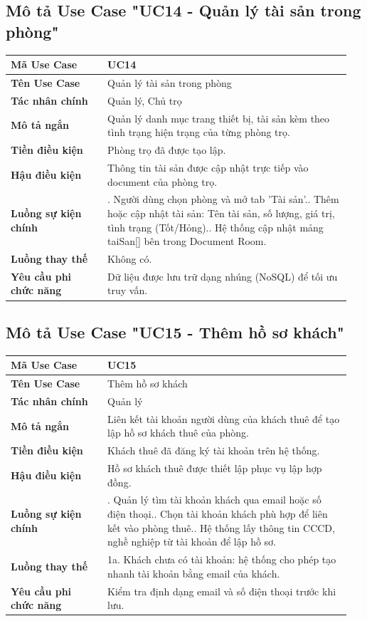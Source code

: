 \subsection{Mô tả Use Case "UC14 - Quản lý tài sản trong phòng"}

\begin{longtable}[]{@{}>{\RaggedRight\arraybackslash}p{0.27\linewidth}>{\RaggedRight\arraybackslash}p{0.68\linewidth}@{}}
\toprule
\textbf{Mã Use Case} & UC14\tabularnewline
\midrule
\endhead
\textbf{Tên Use Case} & Quản lý tài sản trong phòng\tabularnewline
\textbf{Tác nhân chính} & Quản lý, Chủ trọ\tabularnewline
\textbf{Mô tả ngắn} & Quản lý danh mục trang thiết bị, tài sản kèm theo
tình trạng hiện trạng của từng phòng trọ.\tabularnewline
\textbf{Tiền điều kiện} & Phòng trọ đã được tạo lập.\tabularnewline
\textbf{Hậu điều kiện} & Thông tin tài sản được cập nhật trực tiếp vào
document của phòng trọ.\tabularnewline
\textbf{Luồng sự kiện chính} & 1. Người dùng chọn
phòng và mở tab 'Tài sản'.\newline 2. Thêm hoặc cập nhật tài sản:
Tên tài sản, số lượng, giá trị, tình trạng (Tốt/Hỏng).\newline 3.
Hệ thống cập nhật mảng taiSan{[}{]} bên trong Document
Room.\tabularnewline
\textbf{Luồng thay thế} & Không có.\tabularnewline
\textbf{Yêu cầu phi chức năng} & Dữ liệu được lưu trữ dạng nhúng (NoSQL)
để tối ưu truy vấn.\tabularnewline
\bottomrule
\end{longtable}

\subsection{Mô tả Use Case "UC15 - Thêm hồ sơ khách"}

\begin{longtable}[]{@{}>{\RaggedRight\arraybackslash}p{0.27\linewidth}>{\RaggedRight\arraybackslash}p{0.68\linewidth}@{}}
\toprule
\textbf{Mã Use Case} & UC15\tabularnewline
\midrule
\endhead
\textbf{Tên Use Case} & Thêm hồ sơ khách\tabularnewline
\textbf{Tác nhân chính} & Quản lý\tabularnewline
\textbf{Mô tả ngắn} & Liên kết tài khoản người dùng của khách thuê để
tạo lập hồ sơ khách thuê của phòng.\tabularnewline
\textbf{Tiền điều kiện} & Khách thuê đã đăng ký tài khoản trên hệ
thống.\tabularnewline
\textbf{Hậu điều kiện} & Hồ sơ khách thuê được thiết lập phục vụ lập hợp
đồng.\tabularnewline
\textbf{Luồng sự kiện chính} & 1. Quản lý tìm tài
khoản khách qua email hoặc số điện thoại.\newline 2. Chọn tài khoản
khách phù hợp để liên kết vào phòng thuê.\newline 3. Hệ thống lấy
thông tin CCCD, nghề nghiệp từ tài khoản để lập hồ sơ.\tabularnewline
\textbf{Luồng thay thế} & 1a. Khách chưa có tài khoản: hệ thống cho phép
tạo nhanh tài khoản bằng email của khách.\tabularnewline
\textbf{Yêu cầu phi chức năng} & Kiểm tra định dạng email và số điện
thoại trước khi lưu.\tabularnewline
\bottomrule
\end{longtable}

